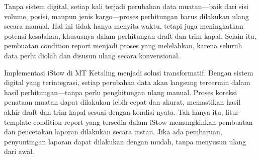 Tanpa sistem digital, setiap kali terjadi perubahan data muatan—baik dari sisi volume, posisi, maupun jenis kargo—proses perhitungan harus dilakukan ulang secara manual. Hal ini tidak hanya menyita waktu, tetapi juga meningkatkan potensi kesalahan, khususnya dalam perhitungan draft dan trim kapal. Selain itu, pembuatan condition report menjadi proses yang melelahkan, karena seluruh data perlu diolah dan disusun ulang secara konvensional.

Implementasi iStow di MT Ketaling menjadi solusi transformatif. Dengan sistem digital yang terintegrasi, setiap perubahan data akan langsung tercermin dalam hasil perhitungan—tanpa perlu penghitungan ulang manual. Proses koreksi penataan muatan dapat dilakukan lebih cepat dan akurat, memastikan hasil akhir draft dan trim kapal sesuai dengan kondisi nyata. Tak hanya itu, fitur template condition report yang tersedia dalam iStow memungkinkan pembuatan dan pencetakan laporan dilakukan secara instan. Jika ada pembaruan, penyuntingan laporan dapat dilakukan dengan mudah, tanpa menyusun ulang dari awal.
